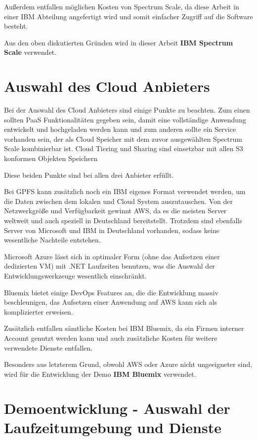 Außerdem entfallen möglichen Kosten von Spectrum Scale, da diese Arbeit in einer IBM Abteilung angefertigt wird und somit einfacher Zugriff auf die Software besteht.

Aus den oben diskutierten Gründen wird in dieser Arbeit \textbf{IBM Spectrum Scale} verwendet.

\section{Auswahl des Cloud Anbieters}

Bei der Auswahl des Cloud Anbieters sind einige Punkte zu beachten. Zum einen sollten \acs{PaaS} Funktionalitäten gegeben sein, damit eine vollständige Anwendung entwickelt und hochgeladen werden kann und zum anderen sollte ein Service vorhanden sein, der als Cloud Speicher mit dem zuvor ausgewählten Spectrum Scale kombinierbar ist.
Cloud Tiering und Sharing sind einsetzbar mit allen S3 konformen Objekten Speichern %

Diese beiden Punkte sind bei allen drei Anbieter erfüllt.

Bei \acs{GPFS} kann zusätzlich noch ein IBM eigenes Format verwendet werden, um die Daten zwischen dem lokalen und Cloud System auszutauschen.
Von der Netzwerkgröße und Verfügbarkeit gewinnt \acs{AWS}, da es die meisten Server weltweit und auch speziell in Deutschland bereitstellt. Trotzdem sind ebenfalls Server von Microsoft und IBM in Deutschland vorhanden, sodass keine wesentliche Nachteile entstehen.

Microsoft Azure lässt sich in optimaler Form (ohne das Aufsetzen einer dedizierten \acs{VM}) mit .NET Laufzeiten benutzen, was die Auswahl der Entwicklungswerkzeuge wesentlich einschränkt.

Bluemix bietet einige DevOps Features an, die die Entwicklung massiv beschleunigen, das Aufsetzen einer Anwendung auf \acs{AWS} kann sich als komplizierter erweisen.

Zusätzlich entfallen sämtliche Kosten bei IBM Bluemix, da ein Firmen interner Account genutzt werden kann und auch zusätzliche Kosten für weitere verwendete Dienste entfallen.

Besonders aus letzterem Grund, obwohl AWS oder Azure nicht ungeeigneter sind, wird für die Entwicklung der Demo \textbf{IBM Bluemix} verwendet.

\section{Demoentwicklung - Auswahl der Laufzeitumgebung und Dienste}

